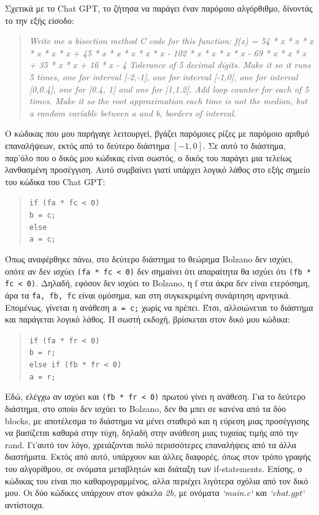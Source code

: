 \documentclass[a4paper, 14pt]{article}   %
\begin{document}
Σχετικά με το Chat GPT, το ζήτησα να παράγει έναν παρόμοιο αλγόρθιθμο, δίνοντάς το την εξής είσοδο:
	\begin{quote}
	{\small \emph{Write me a bisection method C code for this function: f(x) = 54 * x * x * x * x * x * x + 45 * x * x * x * x * x - 102 * x * x * x * x - 69 * x * x * x + 35 * x * x + 16 * x - 4
Tolerance of 5 decimal digits.
Make it so it runs 5 times, one for interval [-2,-1], one for interval [-1,0], one for interval [0,0.4], one for [0.4, 1] and one for [1,1.2]. Add loop counter for each of 5 times.
Make it so the root approximation each time is not the median, but a random variable between a and b, borders of interval.}}
	\end{quote}
Ο κώδικας που μου παρήγαγε λειτουργεί, βγάζει παρόμοιες ρίζες με παρόμοιο αριθμό επαναλήψεων, εκτός από το δεύτερο διάστημα \([-1,0]\). Σε αυτό το διάστημα, παρ'όλο που ο δικός μου κώδικας είναι σωστός, ο δικός του παράγει μια τελείως λανθασμένη προσέγγιση. Αυτό συμβαίνει γιατί υπάρχει λογικό λάθος στο εξής σημείο του κώδικα του Chat GPT:
	\begin{quote}
	{\small \texttt{if (fa * fc < 0)\\
           b = c;\\
        else\\
           a = c;\\
      }}
	\end{quote}
Όπως αναφέρθηκε πάνω, στο δεύτερο διάστημα το θεώρημα Bolzano δεν ισχύει, οπότε αν δεν ισχύει \texttt{(fa * fc < 0)} δεν σημαίνει ότι απαραίτητα θα ισχύει ότι \texttt{(fb * fc < 0)}. Δηλαδή, εφόσον δεν ισχύει το Bolzano, η f στα άκρα δεν είναι ετερόσημη, άρα τα \texttt{fa, fb, fc} είναι ομόσημα, και στη συγκεκριμένη συνάρτηση αρνητικά. Επομένως, γίνεται η ανάθεση \texttt{a = c;} χωρίς να πρέπει. Έτσι, αλλοιώνεται το διάστημα και παράγεται λογικό λάθος. Η σωστή εκδοχή, βρίσκεται στον δικό μου κώδικα:
	\begin{quote}
	{\small \texttt{if (fa * fr < 0)\\
        b = r;\\
      else if (fb * fr < 0)\\
        a = r;\\
     }}
	\end{quote}
Εδώ, ελέγχω αν ισχύει και \texttt{(fb * fr < 0)} πρωτού γίνει η ανάθεση. Για το δεύτερο διάστημα, στο οποίο δεν ισχύει το Bolzano, δεν θα μπει σε κανένα από τα δύο blocks, με αποτέλεσμα το διάστημα να μένει σταθερό και η εύρεση μιας προσέγγισης να βασίζεται καθαρά στην τύχη, δηλαδή στην ανάθεση μιας τυχαίας  τιμής από την rand. Γι'αυτό τον λόγο, χρειάζονται πολύ περισσότερες επαναλήψεις από τα άλλα διαστήματα. Εκτός από αυτό, υπάρχουν και άλλες διαφορές, όπως στον τρόπο γραφής του αλγορίθμου, σε ονόματα μεταβλητών και διάταξη των if-statements. Επίσης, ο κώδικας του είναι πιο καθαρογραμμένος, αλλα περιέχει λιγότερα σχόλια από τον δικό μου. Οι δύο κώδικες υπάρχουν στον φάκελο \emph{2b}, με ονόματα \emph{`main.c`} και \emph{`chat.gpt`} αντίστοιχα.\\
\end{document}
